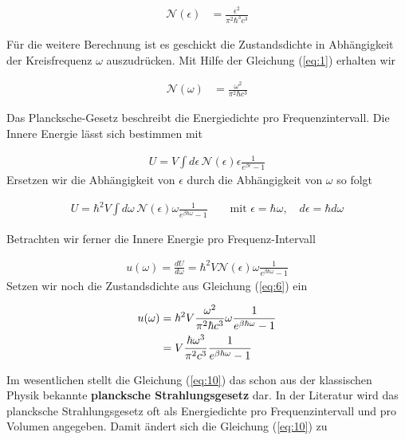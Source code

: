 \begin{align}
  \label{eq:5}
   \mathcal N (\epsilon) &= \frac{ \epsilon^2}{\pi^2 \hbar^3 c^3} 
\end{align}

Für die weitere Berechnung ist es geschickt die Zustandsdichte in Abhängigkeit der Kreisfrequenz \(\omega\) auszudrücken. Mit Hilfe der Gleichung (\ref{eq:1}) erhalten wir

\begin{align}
  \label{eq:6}
   \mathcal N (\omega) &= \frac{ \omega^2}{\pi^2 \hbar c^3} 
\end{align}

Das Plancksche-Gesetz beschreibt die Energiedichte pro Frequenzintervall. Die Innere Energie lässt sich bestimmen mit

\begin{align}
  \label{eq:7}
  U = V\int d\epsilon\,\mathcal N(\epsilon) \epsilon \frac{1}{e^{\beta \epsilon}-1} 
\end{align}
Ersetzen wir die Abhängigkeit von \(\epsilon\) durch die Abhängigkeit von \(\omega\) so folgt

\begin{align}
  \label{eq:8}
  U =\hbar^2 V\int d\omega\,\mathcal N(\epsilon) \omega \frac{1}{e^{\beta \hbar\omega}-1} \qquad \text{mit }\epsilon =\hbar\omega,\quad d\epsilon = \hbar d\omega 
\end{align}

Betrachten wir ferner die Innere Energie pro Frequenz-Intervall

\begin{align}
  \label{eq:9}
  u(\omega) = \frac{dU}{d\omega} =  \hbar^2 V \mathcal N(\epsilon) \omega \frac{1}{e^{\beta \hbar\omega}-1}
\end{align}
Setzen wir noch die Zustandsdichte aus Gleichung (\ref{eq:6}) ein

\begin{align}
  \label{eq:10}
   u(\omega) &= \hbar^2 V \frac{ \omega^2}{\pi^2 \hbar c^3}  \omega \frac{1}{e^{\beta \hbar\omega}-1} \notag \\
 &=  V \frac{\hbar  \omega^3}{\pi^2  c^3} \frac{1}{e^{\beta \hbar\omega}-1} 
\end{align}

Im wesentlichen stellt die Gleichung (\ref{eq:10}) das schon aus der klassischen Physik bekannte \textbf{plancksche Strahlungsgesetz} dar. In der Literatur wird das plancksche Strahlungsgesetz oft als Energiedichte pro Frequenzintervall und pro Volumen angegeben. Damit ändert sich die Gleichung (\ref{eq:10}) zu

